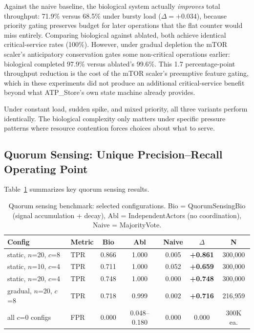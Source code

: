 Against the naive baseline, the biological system actually \emph{improves}
total throughput: 71.9\% versus 68.5\% under bursty load ($\Delta = +0.034$),
because priority gating preserves budget for later operations that the
flat counter would miss entirely.  Comparing biological against ablated,
both achieve identical critical-service rates (100\%).  However, under
gradual depletion the mTOR scaler's anticipatory conservation gates some
non-critical operations earlier: biological completed 97.9\% versus
ablated's 99.6\%.  This 1.7 percentage-point throughput reduction is the
cost of the mTOR scaler's preemptive feature gating, which in these
experiments did not produce an additional critical-service benefit
beyond what ATP\_Store's own state machine already provides.

Under constant load, sudden spike, and mixed priority, all three
variants perform identically.  The biological complexity only matters
under specific pressure patterns where resource contention forces
choices about what to serve.

\subsection{Quorum Sensing: Unique Precision--Recall Operating Point}

Table~\ref{tab:quorum} summarizes key quorum sensing results.

\begin{table}[h]
\caption{Quorum sensing benchmark: selected configurations. Bio = QuorumSensingBio (signal accumulation + decay), Abl = IndependentActors (no coordination), Naive = MajorityVote.}
\label{tab:quorum}
\centering
\small
\begin{tabular}{llccccc}
\toprule
Config & Metric & Bio & Abl & Naive & $\Delta$ & N \\
\midrule
static, $n$=20, $c$=8 & TPR & 0.866 & 1.000 & 0.005 & \textbf{+0.861} & 300{,}000 \\
static, $n$=10, $c$=4 & TPR & 0.711 & 1.000 & 0.052 & \textbf{+0.659} & 300{,}000 \\
static, $n$=20, $c$=4 & TPR & 0.748 & 1.000 & 0.000 & \textbf{+0.748} & 300{,}000 \\
gradual, $n$=20, $c$=8 & TPR & 0.718 & 0.999 & 0.002 & \textbf{+0.716} & 216{,}959 \\
\midrule
all $c$=0 configs & FPR & 0.000 & 0.048--0.180 & 0.000 & 0.000 & 300K ea. \\
\bottomrule
\end{tabular}
\end{table}

